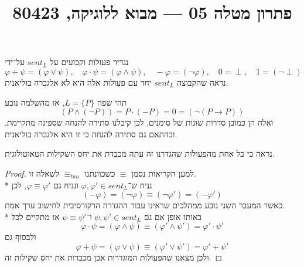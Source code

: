 
\title{פתרון מטלה 05 --- מבוא ללוגיקה, 80423}


\maketitle
\maketitleprint{}

\question{}
\subquestion{}
נגדיר פעולות וקבועים על $sent_L$ על־ידי
\[
	\varphi + \psi = (\varphi \lor \psi),
	\quad
	\varphi \cdot \psi = (\varphi \land \psi),
	\quad
	- \varphi = (\lnot \varphi),
	\quad
	0 = \perp,
	\quad
	1 = (\lnot \perp)
\]
נראה שהקבוצה $sent_L$ יחד עם פעולות אלה היא לא אלגברה בוליאנית.
\begin{solution}
	תהי שפה $L = \{ P \}$, אז מהשלמה נובע
	\[
		(P \land (\lnot P))
		= P \cdot (- P)
		= 0
		= (\lnot (P \to P))
	\]
	ואלה הן כמובן סדרות שונות של סימנים, לכן קיבלנו סתירה להנחה שספיגה מתקיימת, ובהתאם גם סתירה להנחה כי זו היא אלגברה בוליאנית.
\end{solution}

\subquestion{}
נראה כי כל אחת מהפעולות שהגדרנו זה עתה מכבדת את יחס השקילות הטאוטולוגית.
\begin{proof}
	למען הקריאות נסמן $\equiv$ כשכוונתנו $\equiv_{tau}$ לשאלה זו. \\*
	נניח ש־$\varphi, \varphi' \in sent_L$ ונניח גם $\varphi \equiv \varphi'$, לכן
	\[
		(-\varphi) = (\lnot \varphi) \equiv (\lnot \varphi') = (-\varphi')
	\]
	כאשר המעבר השני נובע ממהלכים שראינו עבור ההגדרה הרקורסיבית לחישוב ערך אמת. \\*
	באותו אופן אם גם $\psi, \psi' \in sent_L$ ו־$\psi \equiv \psi'$ אז מתקיים לכל
	\[
		\varphi \cdot \psi
		= (\varphi \land \psi)
		\equiv (\varphi' \land \psi')
		= \varphi' \cdot \psi'
	\]
	ולבסוף גם
	\[
		\varphi + \psi
		= (\varphi \lor \psi)
		\equiv (\varphi' \lor \psi')
		= \varphi' + \psi'
	\]
	ולכן מצאנו שהפעולות המוגדרות אכן מכבדות את יחס שקילות זה.
\end{proof}

